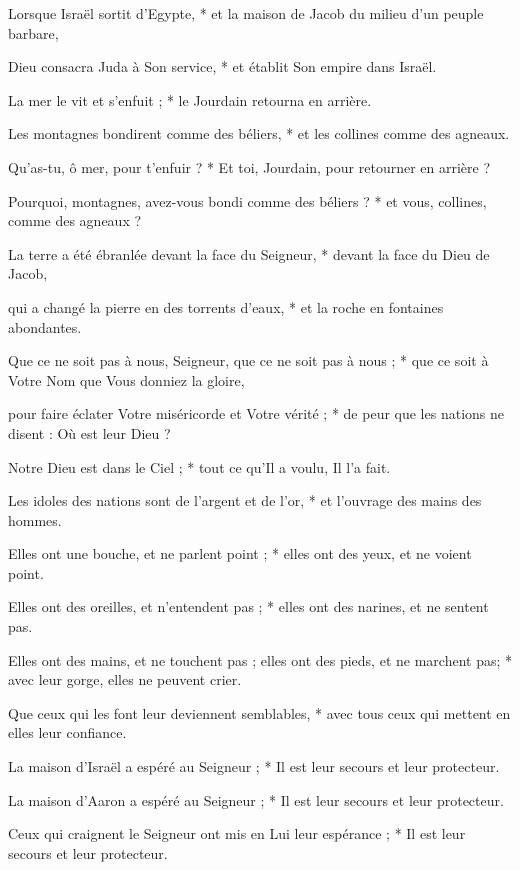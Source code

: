 \item Lorsque Israël sortit d'Egypte, * et la maison de Jacob du milieu d'un peuple barbare,
\item Dieu consacra Juda à Son service, * et établit Son empire dans Israël.
\item La mer le vit et s'enfuit ; * le Jourdain retourna en arrière.
\item Les montagnes bondirent comme des béliers, * et les collines comme des agneaux.
\item Qu'as-tu, ô mer, pour t'enfuir ? * Et toi, Jourdain, pour retourner en arrière ?
\item Pourquoi, montagnes, avez-vous bondi comme des béliers ? * et vous, collines, comme des agneaux ?
\item La terre a été ébranlée devant la face du Seigneur, * devant la face du Dieu de Jacob,
\item qui a changé la pierre en des torrents d'eaux, * et la roche en fontaines abondantes.
\item Que ce ne soit pas à nous, Seigneur, que ce ne soit pas à nous ; *  que ce soit à Votre Nom que Vous donniez la gloire,
\item pour faire éclater Votre miséricorde et Votre vérité ; * de peur que les nations ne disent : Où est leur Dieu ?
\item Notre Dieu est dans le Ciel ; * tout ce qu'Il a voulu, Il l'a fait.
\item Les idoles des nations sont de l'argent et de l'or, * et l'ouvrage des mains des hommes.
\item Elles ont une bouche, et ne parlent point ; * elles ont des yeux, et ne voient point.
\item Elles ont des oreilles, et n'entendent pas ; * elles ont des narines, et ne sentent pas.
\item Elles ont des mains, et ne touchent pas ; elles ont des pieds, et ne marchent pas; * avec leur gorge, elles ne peuvent crier.
\item Que ceux qui les font leur deviennent semblables, * avec tous ceux qui mettent en elles leur confiance.
\item La maison d'Israël a espéré au Seigneur ; * Il est leur secours et leur protecteur.
\item La maison d'Aaron a espéré au Seigneur ; * Il est leur secours et leur protecteur.
\item Ceux qui craignent le Seigneur ont mis en Lui leur espérance ; * Il est leur secours et leur protecteur.
